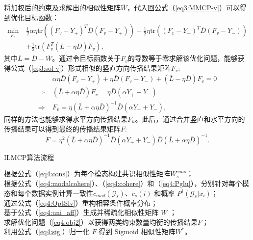 将加权后的约束及求解出的相似性矩阵$\bar{W}$，代入回公式（\ref{eq3:MMCP-v}）可以得到优化目标函数：
\begin{equation}
\begin{split}
\mathop{\mathrm{min}}_{{F}_v}\;&\frac{1}{2}\alpha\eta \mathrm{tr}(({F}_v-{Y}_+)^T{\bar{D}}({F}_v-{Y}_+))+\frac{1}{2}\eta \mathrm{tr}(({F}_v-{Y}_-)^T{\bar{D}}({F}_v-{Y}_-))\\
&+\frac{1}{2}\mathrm{tr}({F}_v^T(\bar{L}-\eta {\bar{D}}){F}_v), 
\end{split}
\label{eq4:obj2}
\end{equation}
其中$\bar{L} = \bar{D} - \bar{W}$。通过令目标函数关于$F_v$的导数等于零求解该优化问题，能够获得公式（\ref{eq3:sol-v}）形式相似的竖直方向传播结果矩阵$F_v$:
\begin{equation}
\begin{split}
        & \alpha\eta \bar{D} (F_v - Y_+) + \eta\bar{D} (F_v - Y_-)+(\bar{L}-\eta\bar{D})F_v = 0\\
\Rightarrow   \;          & (\bar{L}+\alpha\eta\bar{D})F_v = \eta\bar{D}(\alpha Y_++Y_-)\\
\Rightarrow   \;          & {F}_v = \eta(\bar{L}+\alpha\eta{\bar{D}})^{-1}{\bar{D}}(\alpha {Y}_++{Y}_-),
\end{split}
\end{equation}
同样的方法也能够求得水平方向传播结果$F_h$。此后，通过合并竖直和水平方向的传播结果可以得到最终的传播结果矩阵$F$:
\begin{equation}
{ F} = \eta^2(\bar{L}+\alpha\eta{\bar{D}})^{-1}{\bar{D}}(\alpha {Y}_++{Y}_-){\bar{D}}(\bar{L}+\alpha\eta{\bar{D}})^{-1}.
\end{equation}


\begin{algorithm}[tb]
    \caption{ILMCP算法流程}
    \label{alg4:ilmcp}
    根据公式（\ref{eq4:cons}）为每个模态构建共识相似性矩阵$ {W} ^{cons}_s$；\\
    根据公式（\ref{eq4:modalcohere}）、（\ref{eq4:cohere}）和（\ref{eq4:Pglu}），分别针对每个模态和每个数据实例计算一致性$ c_{mod}(\mathcal{G}_s)$、$c_s(i) $ 和概率 $ P^\dagger (\mathcal{G}_s|x_i) $；\\
    通过公式（\ref{eq4:OptSlv}）重构相容条件概率分布；\\
    基于公式（\ref{eq4:uni_aff}）生成并稀疏化相似性矩阵 $ {W} $ ；\\
    求解优化问题（\ref{eq4:obj2}）以获得两类约束数量均衡的传播结果$ {F} $；\\
    利用公式（\ref{eq4:sig}）归一化 $ {F} $ 得到 Sigmoid 相似性矩阵$ {W^*}$。
\end{algorithm}

